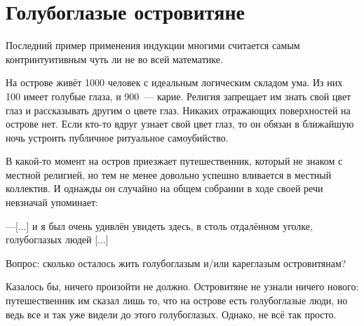 \section{Голубоглазые островитяне}

Последний пример применения индукции многими считается самым контринтуитивным чуть ли не во всей математике.

\begin{example}
   На острове живёт 1000 человек с идеальным логическим складом ума. Из них 100 имеет голубые глаза, и 900~— карие. Религия запрещает им знать свой цвет глаз и рассказывать другим о цвете глаз. Никаких отражающих поверхностей на острове нет. Если кто-то вдруг узнает свой цвет глаз, то он обязан в ближайшую ночь устроить публичное ритуальное самоубийство.

    В какой-то момент на остров приезжает путешественник, который не знаком с местной религией, но тем не менее довольно успешно вливается в местный коллектив. И однажды он случайно на общем собрании в ходе своей речи невзначай упоминает:

    ---[...] и я был очень удивлён увидеть здесь, в столь отдалённом уголке, голубоглазых людей [...]

    Вопрос: сколько осталось жить голубоглазым и/или кареглазым островитянам?
\end{example}

Казалось бы, ничего произойти не должно. Островитяне не узнали ничего нового: путешественник им сказал лишь то, что на острове есть голубоглазые люди, но ведь все и так уже видели до этого голубоглазых. Однако, не всё так просто.


